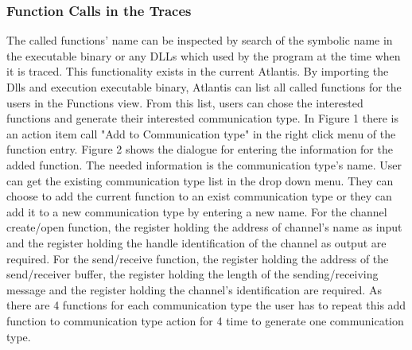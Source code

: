 \documentclass[paper=a4, fontsize=11pt]{scrartcl}
\numberwithin{equation}{section}		%
\numberwithin{figure}{section}			%
\numberwithin{table}{section}				%
\begin{document}
\subsubsection{Function Calls in the Traces}
The called functions' name can be inspected  by  search of the symbolic name in the executable binary or any DLLs which used by the program at the time when it is traced. This functionality exists in the current Atlantis. By importing the Dlls and execution  executable binary, Atlantis can list all called functions for the users in the Functions view. From this list, users can chose the interested functions and generate their interested communication type. In Figure 1 there is  an action item call "Add to Communication type" in the right click menu of the function entry. Figure 2 shows the dialogue for entering the information for the added function. The needed information is the communication type's name. User can get the existing communication type list in the drop down menu. They can choose to add the current function to an exist communication type or they can add it to a new communication type by entering a new name. For the channel create/open function, the register holding the address of channel's name as input and the register holding the handle identification of the channel as output are required. For the send/receive function, the register holding the address of the send/receiver buffer, the register holding the length of the sending/receiving message and the register holding the channel's identification are required. As there are 4 functions for each communication type the user has to repeat this add function to communication type action for 4 time to generate one communication type.
\end{document}
